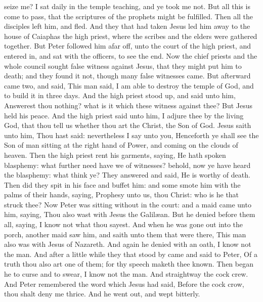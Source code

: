 seize me? I sat daily in the temple teaching, and ye took me not. But all this is come to pass, that the scriptures of the prophets might be fulfilled. Then all the disciples left him, and fled.  And they that had taken Jesus led him away to the house of Caiaphas the high priest, where the scribes and the elders were gathered together. But Peter followed him afar off, unto the court of the high priest, and entered in, and sat with the officers, to see the end. Now the chief priests and the whole council sought false witness against Jesus, that they might put him to death; and they found it not, though many false witnesses came. But afterward came two, and said, This man said, I am able to destroy the temple of God, and to build it in three days. And the high priest stood up, and said unto him, Answerest thou nothing? what is it which these witness against thee? But Jesus held his peace. And the high priest said unto him, I adjure thee by the living God, that thou tell us whether thou art the Christ, the Son of God. Jesus saith unto him, Thou hast said: nevertheless I say unto you, Henceforth ye shall see the Son of man sitting at the right hand of Power, and coming on the clouds of heaven. Then the high priest rent his garments, saying, He hath spoken blasphemy: what further need have we of witnesses? behold, now ye have heard the blasphemy: what think ye? They answered and said, He is worthy of death. Then did they spit in his face and buffet him: and some smote him with the palms of their hands, saying, Prophesy unto us, thou Christ: who is he that struck thee?  Now Peter was sitting without in the court: and a maid came unto him, saying, Thou also wast with Jesus the Galilæan. But he denied before them all, saying, I know not what thou sayest. And when he was gone out into the porch, another maid saw him, and saith unto them that were there, This man also was with Jesus of Nazareth. And again he denied with an oath, I know not the man. And after a little while they that stood by came and said to Peter, Of a truth thou also art one of them; for thy speech maketh thee known. Then began he to curse and to swear, I know not the man. And straightway the cock crew. And Peter remembered the word which Jesus had said, Before the cock crow, thou shalt deny me thrice. And he went out, and wept bitterly. 


